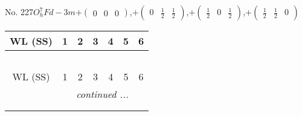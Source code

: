 \documentclass[fleqn,9pt,landscape]{jsarticle}
\begin{document}
\newpage
No. 227\quad$O_{h}^{7}$\quad$Fd-3m$\quad[ cubic ]\quad$+\begin{pmatrix} 0 & 0 & 0 \end{pmatrix}$,\quad $+\begin{pmatrix} 0 & \frac{1}{2} & \frac{1}{2} \end{pmatrix}$,\quad $+\begin{pmatrix} \frac{1}{2} & 0 & \frac{1}{2} \end{pmatrix}$,\quad $+\begin{pmatrix} \frac{1}{2} & \frac{1}{2} & 0 \end{pmatrix}$
\begin{center}
\renewcommand{\arraystretch}{1.2}
\begin{longtable}{ccccccc}
 \hline \hline
WL (SS) & 1 & 2 & 3 & 4 & 5 & 6 \\ \hline \endfirsthead

\multicolumn{6}{l}{\tablename\ \thetable{}} \\
 \hline \hline
WL (SS) & 1 & 2 & 3 & 4 & 5 & 6 \\ \hline \endhead

 \hline \hline
\multicolumn{6}{r}{\footnotesize\it continued ...} \\ \endfoot

 \hline \hline
\multicolumn{6}{r}{} \\ \endlastfoot


\end{longtable}
\end{center}
\end{document}
